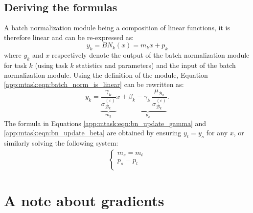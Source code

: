 \subsection*{Deriving the formulas}
A batch normalization module being a composition of linear functions, it is therefore linear and can be re-expressed as:
\begin{equation} \label{app:mtask:eqn:batch_norm_is_linear}
y_k = BN_k(x) = m_k x + p_k
\end{equation}
where $y_k$ and $x$ respectively denote the output of the batch normalization module for task $k$ (\ie using task $k$ statistics and parameters) and the input of the batch normalization module. Using the definition of the module, Equation \ref{app:mtask:eqn:batch_norm_is_linear} can be rewritten as:
\begin{equation} \label{app:mtask:eqn:batch_norm_is_linear_rewritten}
y_k = \underbrace{\dfrac{\gamma_k}{\sigma^{(\epsilon)}_{\mathcal{B}_k}}}_{m_k} x + \underbrace{\beta_k - \gamma_k\ \dfrac{\mu_{\mathcal{B}_k}}{\sigma^{(\epsilon)}_{\mathcal{B}_k}}}_{p_k}.
\end{equation}
The formula in Equations \ref{app:mtask:eqn:bn_update_gamma} and \ref{app:mtask:eqn:bn_update_beta} are obtained by ensuring $y_t = y_s$ for any $x$, or similarly solving the following system:
\begin{align}
\begin{cases}
m_s = m_t\\
p_s = p_t\\
\end{cases}
\end{align}

\section{A note about gradients}
\label{app:mtask:sec:app:gradients}

